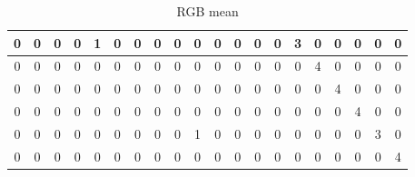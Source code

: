 \documentclass{IEEEtran}
\begin{document}
\begin{table}[h!]
\begin{tabular}{|c|c|c|c|c|c|c|c|c|c|c|c|c|c|c|c|c|c|c|c|}
\hline
0 & 0 & 0 & 0 & \cellcolor{red!25}1 & 0 & 0 & 0 & 0 & 0 & 0 & 0 & 0 & 0 & \cellcolor{blue!25}3 & 0 & 0 & 0 & 0 & 0\\
\hline
0 & 0 & 0 & 0 & 0 & 0 & 0 & 0 & 0 & 0 & 0 & 0 & 0 & 0 & 0 & \cellcolor{blue!25}4 & 0 & 0 & 0 & 0\\
\hline
0 & 0 & 0 & 0 & 0 & 0 & 0 & 0 & 0 & 0 & 0 & 0 & 0 & 0 & 0 & 0 & \cellcolor{blue!25}4 & 0 & 0 & 0\\
\hline
0 & 0 & 0 & 0 & 0 & 0 & 0 & 0 & 0 & 0 & 0 & 0 & 0 & 0 & 0 & 0 & 0 & \cellcolor{blue!25}4 & 0 & 0\\
\hline
0 & 0 & 0 & 0 & 0 & 0 & 0 & 0 & 0 & \cellcolor{red!25}1 & 0 & 0 & 0 & 0 & 0 & 0 & 0 & 0 & \cellcolor{blue!25}3 & 0\\
\hline
0 & 0 & 0 & 0 & 0 & 0 & 0 & 0 & 0 & 0 & 0 & 0 & 0 & 0 & 0 & 0 & 0 & 0 & 0 & \cellcolor{blue!25}4\\
\hline
\end{tabular}
\caption{RGB mean}
\label{tb:rgb_mean}
\end{table}
\end{document}
